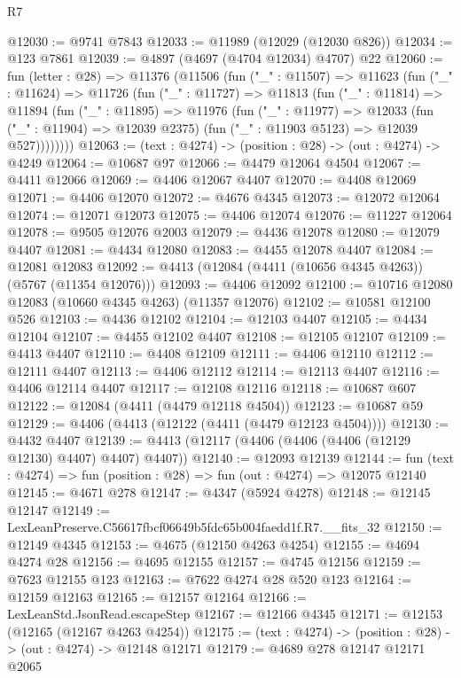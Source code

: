 \begin{lexlean}{R7}
\begin{coremodule}
@12030 := @9741 @7843
@12033 := @11989 (@12029 (@12030 @826))
@12034 := @123 @7861
@12039 := @4897 (@4697 (@4704 @12034) @4707) @22
@12060 := fun (letter : @28) =>
  @11376
    (@11506
      (fun ("_" : @11507) =>
      @11623
        (fun ("_" : @11624) =>
        @11726
          (fun ("_" : @11727) =>
          @11813
            (fun ("_" : @11814) =>
            @11894
              (fun ("_" : @11895) =>
              @11976
                (fun ("_" : @11977) =>
                @12033
                  (fun ("_" : @11904) => @12039 @2375)
                  (fun ("_" : @11903 @5123) => @12039 @527))))))))
@12063 := (text : @4274) -> (position : @28) -> (out : @4274) -> @4249
@12064 := @10687 @97
@12066 := @4479 @12064 @4504
@12067 := @4411 @12066
@12069 := @4406 @12067 @4407
@12070 := @4408 @12069
@12071 := @4406 @12070
@12072 := @4676 @4345
@12073 := @12072 @12064
@12074 := @12071 @12073
@12075 := @4406 @12074
@12076 := @11227 @12064
@12078 := @9505 @12076 @2003
@12079 := @4436 @12078
@12080 := @12079 @4407
@12081 := @4434 @12080
@12083 := @4455 @12078 @4407
@12084 := @12081 @12083
@12092 := @4413 (@12084 (@4411 (@10656 @4345 @4263)) (@5767 (@11354 @12076)))
@12093 := @4406 @12092
@12100 := @10716 @12080 @12083 (@10660 @4345 @4263) (@11357 @12076)
@12102 := @10581 @12100 @526
@12103 := @4436 @12102
@12104 := @12103 @4407
@12105 := @4434 @12104
@12107 := @4455 @12102 @4407
@12108 := @12105 @12107
@12109 := @4413 @4407
@12110 := @4408 @12109
@12111 := @4406 @12110
@12112 := @12111 @4407
@12113 := @4406 @12112
@12114 := @12113 @4407
@12116 := @4406 @12114 @4407
@12117 := @12108 @12116
@12118 := @10687 @607
@12122 := @12084 (@4411 (@4479 @12118 @4504))
@12123 := @10687 @59
@12129 := @4406 (@4413 (@12122 (@4411 (@4479 @12123 @4504))))
@12130 := @4432 @4407
@12139 := @4413 (@12117 (@4406 (@4406 (@4406 (@12129 @12130) @4407) @4407) @4407))
@12140 := @12093 @12139
@12144 := fun (text : @4274) => fun (position : @28) => fun (out : @4274) => @12075 @12140
@12145 := @4671 @278
@12147 := @4347 (@5924 @4278)
@12148 := @12145 @12147
@12149 := LexLeanPreserve.C56617fbcf06649b5fdc65b004faedd1f.R7.__fits_32
@12150 := @12149 @4345
@12153 := @4675 (@12150 @4263 @4254)
@12155 := @4694 @4274 @28
@12156 := @4695 @12155
@12157 := @4745 @12156
@12159 := @7623 @12155 @123
@12163 := @7622 @4274 @28 @520 @123
@12164 := @12159 @12163
@12165 := @12157 @12164
@12166 := LexLeanStd.JsonRead.escapeStep
@12167 := @12166 @4345
@12171 := @12153 (@12165 (@12167 @4263 @4254))
@12175 := (text : @4274) -> (position : @28) -> (out : @4274) -> @12148 @12171
@12179 := @4689 @278 @12147 @12171 @2065

\end{coremodule}
\end{lexlean}
